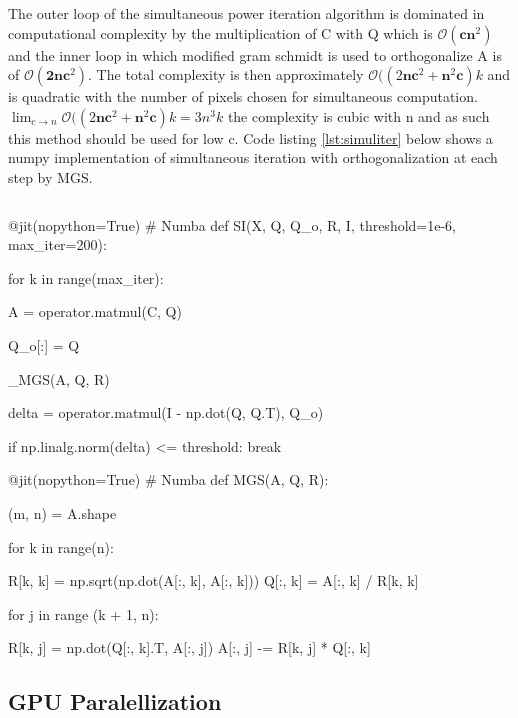 \documentclass[12pt]{article}
\begin{document}
The outer loop of the simultaneous power iteration algorithm is dominated in computational complexity by the multiplication of C with Q which is $\mathcal{O}(\textbf{cn}^2)$ and the inner loop in which modified gram schmidt is used to orthogonalize A is of $\mathcal{O}(\textbf{2nc}^2)$. The total complexity is then approximately $\mathcal{O}((2\textbf{nc}^2+\textbf{n}^2\textbf{c})k$ and is quadratic with the number of pixels chosen for simultaneous computation. $\lim_{c \to n} \mathcal{O}((2\textbf{nc}^2+\textbf{n}^2\textbf{c})k=3n^3k$ the complexity is cubic with n and as such this method should be used for low c. Code listing \ref{lst:simuliter} below shows a numpy implementation of simultaneous iteration with orthogonalization at each step by MGS. 
\pagebreak
\begin{lstlisting}[frame=none,caption={Calculating Principal Components with Eigenvalue Decomposition via Simultaneous Power Iteration},captionpos=b,label=lst:simuliter]
\end{lstlisting}
\begin{python}
@jit(nopython=True) # Numba
def SI(X, Q, Q_o, R, I, threshold=1e-6, max_iter=200): 

    for k in range(max_iter):

        A = operator.matmul(C, Q)

        Q_o[:] = Q

        _MGS(A, Q, R)

        delta = operator.matmul(I - np.dot(Q, Q.T), Q_o)
       
        if np.linalg.norm(delta) <= threshold:
            break
            
@jit(nopython=True) # Numba
def MGS(A, Q, R):

    (m, n) = A.shape

    for k in range(n):

        R[k, k] = np.sqrt(np.dot(A[:, k], A[:, k]))
        Q[:, k] = A[:, k] / R[k, k]

        for j in range (k + 1, n):

            R[k, j] = np.dot(Q[:, k].T, A[:, j])
            A[:, j] -= R[k, j] * Q[:, k]
\end{python}

\subsection{GPU Paralellization}\label{3.4}
\end{document}
